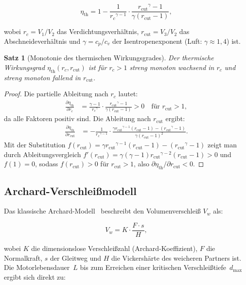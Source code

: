 ﻿\documentclass[12pt,a4paper]{article}
\newtheorem{theorem}{Satz}[section]
\newcommand{\etath}{\ensuremath{\eta_{\mathrm{th}}}}
\newcommand{\rc}{\ensuremath{r_c}}
\newcommand{\rcut}{\ensuremath{r_{\mathrm{cut}}}}
\begin{document}
\begin{equation}
  \etath = 1 - \frac{1}{\rc^{\gamma - 1}} \cdot
  \frac{\rcut^{\gamma} - 1}{\gamma(\rcut - 1)},
  \label{eq:eta_diesel}
\end{equation}

wobei $\rc = V_1 / V_2$ das Verdichtungsverhältnis,
$\rcut = V_3 / V_2$ das Abschneideverhältnis und
$\gamma = c_p / c_v$ der Isentropenexponent (Luft: $\gamma \approx 1{,}4$) ist.

\begin{theorem}[Monotonie des thermischen Wirkungsgrades]
\label{thm:eta_monoton}
Der thermische Wirkungsgrad $\etath(\rc, \rcut)$ ist für $\rc > 1$ streng
monoton wachsend in $\rc$ und streng monoton fallend in $\rcut$.
\end{theorem}

\begin{proof}
Die partielle Ableitung nach $\rc$ lautet:
\begin{align}
  \frac{\partial \etath}{\partial \rc}
  &= \frac{\gamma - 1}{\rc^{\gamma}} \cdot
     \frac{\rcut^{\gamma} - 1}{\gamma(\rcut - 1)} > 0
     \quad \text{für } \rcut > 1,
\end{align}
da alle Faktoren positiv sind. Die Ableitung nach $\rcut$ ergibt:
\begin{align}
  \frac{\partial \etath}{\partial \rcut}
  &= -\frac{1}{\rc^{\gamma-1}} \cdot
     \frac{\gamma \rcut^{\gamma-1}(\rcut-1) - (\rcut^{\gamma}-1)}
          {\gamma (\rcut-1)^2}.
\end{align}
Mit der Substitution $f(\rcut) = \gamma \rcut^{\gamma-1}(\rcut-1) - (\rcut^{\gamma}-1)$
zeigt man durch Ableitungsvergleich $f'(\rcut) = \gamma(\gamma-1)\rcut^{\gamma-2}(\rcut-1) > 0$
und $f(1)=0$, sodass $f(\rcut)>0$ für $\rcut > 1$, also
$\partial\etath/\partial\rcut < 0$.
\end{proof}

\subsection{Archard-Verschlei\ss{}modell}
\label{sec:grundlagen_archard}

Das klassische Archard-Modell~\cite{archard1953} beschreibt den Volumenverschlei\ss{} $V_w$ als:

\begin{equation}
  V_w = K \cdot \frac{F \cdot s}{H},
  \label{eq:archard}
\end{equation}

wobei $K$ die dimensionslose Verschlei\ss{}zahl (Archard-Koeffizient),
$F$ die Normalkraft, $s$ der Gleitweg und $H$ die Vickershärte des weicheren
Partners ist. Die Motorlebensdauer~$L$ bis zum Erreichen einer kritischen
Verschlei\ss{}tiefe~$d_{\max}$ ergibt sich direkt zu:
\end{document}

